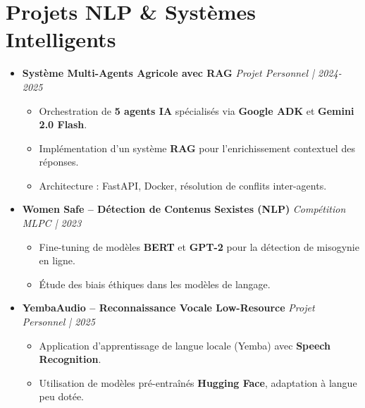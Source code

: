 \documentclass[a4paper,11pt]{article}
\begin{document}
\section{Projets NLP \& Systèmes Intelligents}
\begin{itemize}[leftmargin=*, label={-}]

\item \textbf{Système Multi-Agents Agricole avec RAG} \hfill \textit{Projet Personnel | 2024-2025}
\vspace{-2pt}
    \begin{itemize}[leftmargin=0.4cm, nosep, label=\tiny$\bullet$]
        \item \small{Orchestration de \textbf{5 agents IA} spécialisés via \textbf{Google ADK} et \textbf{Gemini 2.0 Flash}.}
        \item \small{Implémentation d'un système \textbf{RAG} pour l'enrichissement contextuel des réponses.}
        \item \small{Architecture : FastAPI, Docker, résolution de conflits inter-agents.}
    \end{itemize}
\vspace{3pt}

\item \textbf{Women Safe -- Détection de Contenus Sexistes (NLP)} \hfill \textit{Compétition MLPC | 2023}
\vspace{-2pt}
    \begin{itemize}[leftmargin=0.4cm, nosep, label=\tiny$\bullet$]
        \item \small{Fine-tuning de modèles \textbf{BERT} et \textbf{GPT-2} pour la détection de misogynie en ligne.}
        \item \small{Étude des biais éthiques dans les modèles de langage.}
    \end{itemize}
\vspace{3pt}

\item \textbf{YembaAudio -- Reconnaissance Vocale Low-Resource} \hfill \textit{Projet Personnel | 2025}
\vspace{-2pt}
    \begin{itemize}[leftmargin=0.4cm, nosep, label=\tiny$\bullet$]
        \item \small{Application d'apprentissage de langue locale (Yemba) avec \textbf{Speech Recognition}.}
        \item \small{Utilisation de modèles pré-entraînés \textbf{Hugging Face}, adaptation à langue peu dotée.}
    \end{itemize}
\vspace{3pt}


\end{itemize}
\end{document}
